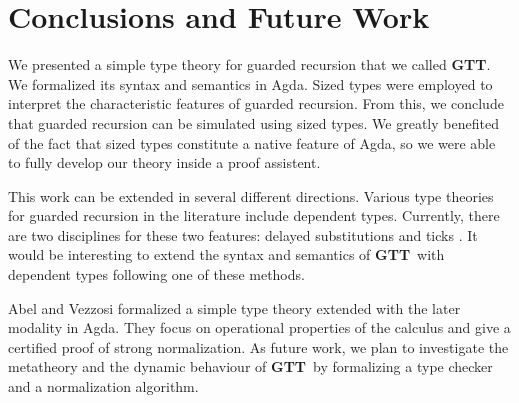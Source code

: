 \documentclass[a4paper,UKenglish,cleveref, autoref,numberwithinsect]{lipics-v2019}
\newcommand{\remove}[1]{}
\newcommand{\GTT}{\textbf{GTT}}
\begin{document}
\section{Conclusions and Future Work}
\label{sec:concl}
We presented a simple type theory for guarded recursion that we called \GTT. We
formalized its syntax and semantics in Agda. Sized types
were employed to interpret the characteristic
features of guarded recursion. From this, we conclude that guarded
recursion can be simulated using sized types. We greatly benefited
of the fact that sized types constitute a native feature of Agda, so
we were able to fully develop our theory inside a proof assistent. 

This work can be extended in several different directions.
Various type theories for guarded recursion in the literature include
dependent types. Currently, there are two disciplines for these two features: delayed substitutions
\cite{bizjak2016guarded} and ticks \cite{BahrGM17}. It would be interesting to extend
the syntax and semantics of \GTT\ with dependent types following one
of these methods.

Abel and Vezzosi \cite{AbelV14} formalized a simple type theory
extended with the later modality in Agda. They focus on operational
properties of the calculus and give a certified proof of strong
normalization. As future work, we plan to investigate the metatheory
and the dynamic behaviour of \GTT\ by formalizing a  type
checker and a normalization algorithm.



\remove{
and weakening, and we constructed denotational semantics for it in type theory extended with sized types.
From this, we concluded that this theory is consistent and that guarded recursion can be defined via sized types.

There are several possible ways to improve on this result.
First of all, one could define a dependent version of this type theory extended with multiple clocks.
This can be done in two ways.
Either one extends the object theory with delayed substitutions \cite{bizjak2016guarded} or with ticks \cite{BahrGM17}.
Second of all, with the deep embedding in place, one can further study the meta-theory by defining a formalized type checking and a normalization algorithm.
}

\remove{
Finally, we want to understand whether it is possible to reduce sized
types to guarded recursion.  This does not seems directly doable,
since sizes are not uniquely employed with coinductive types as a tool
for easing the productivity check of corecursive definitions, but they
are also used as auxiliary arguments of inductive types for
facilitating the termination check of recursive definitions. It seems
that, in order to capture this dual aspect of sizes, one needs to
extend the existing type theories for guarded recursion with
additional features.
}
\end{document}
